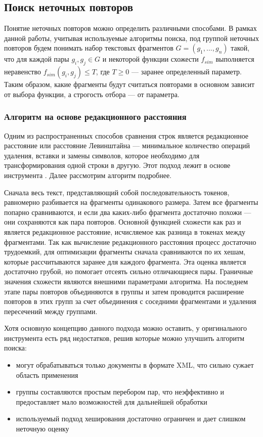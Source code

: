 \documentclass[14pt]{matmex-diploma-custom}
\begin{document}
\subsection{Поиск неточных повторов}

Понятие неточных повторов можно определить различными способами. В рамках данной работы, учитывая используемые алгоритмы поиска, под группой неточных повторов будем понимать набор текстовых фрагментов $G = (g_1,...,g_n)$ такой, что для каждой пары $g_i, g_j \in G$ и некоторой функции схожести $f_{sim}$ выполняется неравенство $f_{sim}(g_i, g_j) \le T$, где $T\ge0$ --- заранее определенный параметр. Таким образом, какие фрагменты будут считаться повторами в основном зависит от выбора функции, а строгость отбора --- от параметра.

\subsubsection{Алгоритм на основе редакционного расстояния}

Одним из распространенных способов сравнения строк является редакционное расстояние или расстояние Левинштайна --- минимальное количество операций удаления, вставки и замены символов, которое необходимо для трансформирования одной строки в другую. Этот подход лежит в основе инструмента \cite{bib:tool:FuzzySearch}. Далее рассмотрим алгоритм подробнее.

Сначала весь текст, представляющий собой последовательность токенов, равномерно разбивается на фрагменты одинакового размера. Затем все фрагменты попарно сравниваются, и если два каких-либо фрагмента достаточно похожи --- они сохраняются как пара повторов. Основной функцией схожести как раз и является редакционное расстояние, исчисляемое как разница в токенах между фрагментами. Так как вычисление редакционного расстояния процесс достаточно трудоемкий, для оптимизации фрагменты сначала сравниваются по их хешам, которые рассчитываются заранее для каждого фрагмента.  Эта оценка является достаточно грубой, но помогает отсеять сильно отличающиеся пары. Граничные значения схожести являются внешними параметрами алгоритма. На последнем этапе пары повторов объединяются в группы и затем проводится расширение повторов в этих групп за счет объединения с соседними фрагментами и удаления пересечений между группами.

Хотя основную концепцию данного подхода можно оставить, у оригинального инструмента есть ряд недостатков, решив которые можно улучшить алгоритм поиска:
\begin{itemize}
	\item могут обрабатываться только документы в формате XML, что сильно сужает область применения
	\item группы составляются простым перебором пар, что неэффективно и предоставляет мало возможностей для дальнейшей обработки
	\item используемый подход хеширования достаточно ограничен и дает слишком неточную оценку
\end{itemize}
\end{document}
